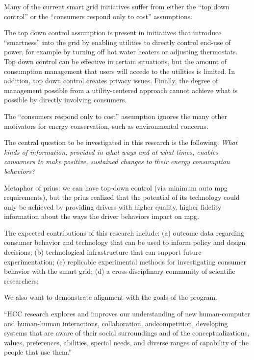 Many of the current smart grid initiatives suffer from either the ``top
down control'' or the ``consumers respond only to cost'' assumptions. 

The top down control assumption is present in initiatives that introduce
``smartness'' into the grid by enabling utilities to directly control
end-use of power, for example by turning off hot water heaters or adjusting
thermostats.   Top down control can be effective in certain situations, but
the amount of consumption management that users will accede to the
utilities is limited.  In addition, top down control creates privacy
issues.  Finally, the degree of management possible from a utility-centered
approach cannot achieve what is possible by directly involving consumers. 

The ``consumers respond only to cost'' assumption ignores the many other
motivators for energy conservation, such as environmental concerns.  

The central question to be investigated in this
research is the following: {\em What kinds of information, provided in what ways and at what
times, enables consumers to make positive, sustained changes to their
energy consumption behaviors?}


Metaphor of prius:  we can have top-down control (via minimum auto mpg
requirements), but the prius realized that the potential of its technology
could only be achieved by providing drivers with higher quality, higher
fidelity information about the ways the driver behaviors impact on mpg.  






The expected contributions of this research include: (a) outcome data
regarding consumer behavior and technology that can be used to inform
policy and design decisions; (b) technological infrastructure that can
support future experimentation; (c) replicable experimental methods for
investigating consumer behavior with the smart grid; (d) a
cross-disciplinary community of scientific researchers; 


We also want to demonstrate alignment with the goals of the program.

``HCC research explores and improves our understanding of new
human-computer and human-human interactions, collaboration, andcompetition, developing systems that are aware of their social surroundings
and of the conceptualizations, values, preferences, abilities, special
needs, and diverse ranges of capability of the people that use them.''

